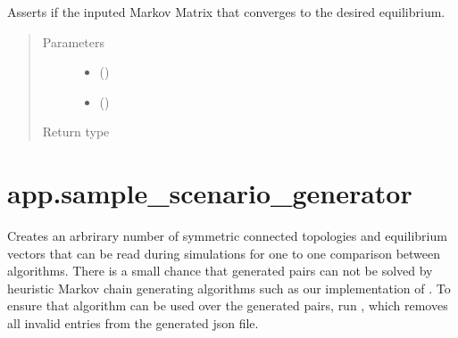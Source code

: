 \documentclass[letterpaper,10pt,english]{sphinxmanual}
\begin{document}
\begin{fulllineitems}
\label{\detokenize{app:sample_scenario_fixer.__validate_mc__}}
Asserts if the inputed Markov Matrix that converges to the desired equilibrium.
\begin{quote}\begin{description}
\item[{Parameters}] \leavevmode\begin{itemize}
\item {} 
 () \textendash{} 

\item {} 
 () \textendash{} 

\end{itemize}

\item[{Return type}] \leavevmode
{}

\end{description}\end{quote}

\end{fulllineitems}



\section{app.sample\_scenario\_generator}
\label{\detokenize{app:module-app.sample_scenario_generator}}\label{\detokenize{app:app-sample-scenario-generator}}
Creates an arbrirary number of symmetric connected topologies and equilibrium
vectors that can be read during simulations for one to one comparison between
algorithms. There is a small chance that generated pairs can not be solved by
heuristic Markov chain generating algorithms such as our implementation of
{\hyperref[\detokenize{app.domain.helpers:app.domain.helpers.matrices._metropolis_hastings}]{}}. To ensure that algorithm
can be used over the generated pairs, run {\hyperref[\detokenize{app:module-sample_scenario_fixer}]{}},
which removes all invalid entries from the generated json file.
\end{document}
